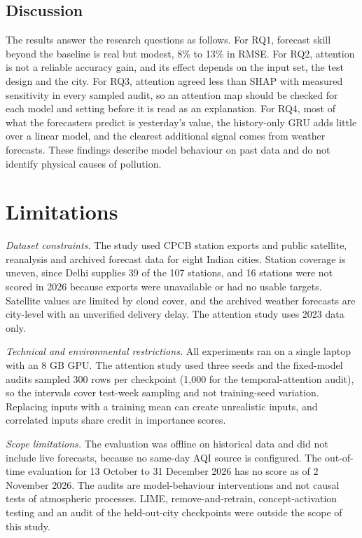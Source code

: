 \documentclass[pdflatex,sn-mathphys-num]{sn-jnl}
\begin{document}
\subsection{Discussion}
The results answer the research questions as follows. For RQ1, forecast skill beyond the baseline is real but modest, 8\% to 13\% in RMSE. For RQ2, attention is not a reliable accuracy gain, and its effect depends on the input set, the test design and the city. For RQ3, attention agreed less than SHAP with measured sensitivity in every sampled audit, so an attention map should be checked for each model and setting before it is read as an explanation. For RQ4, most of what the forecasters predict is yesterday's value, the history-only GRU adds little over a linear model, and the clearest additional signal comes from weather forecasts. These findings describe model behaviour on past data and do not identify physical causes of pollution.

\section{Limitations}\label{sec:limits}
\emph{Dataset constraints.} The study used CPCB station exports and public satellite, reanalysis and archived forecast data for eight Indian cities. Station coverage is uneven, since Delhi supplies 39 of the 107 stations, and 16 stations were not scored in 2026 because exports were unavailable or had no usable targets. Satellite values are limited by cloud cover, and the archived weather forecasts are city-level with an unverified delivery delay. The attention study uses 2023 data only.

\emph{Technical and environmental restrictions.} All experiments ran on a single laptop with an 8 GB GPU. The attention study used three seeds and the fixed-model audits sampled 300 rows per checkpoint (1,000 for the temporal-attention audit), so the intervals cover test-week sampling and not training-seed variation. Replacing inputs with a training mean can create unrealistic inputs, and correlated inputs share credit in importance scores.

\emph{Scope limitations.} The evaluation was offline on historical data and did not include live forecasts, because no same-day AQI source is configured. The out-of-time evaluation for 13 October to 31 December 2026 has no score as of 2 November 2026. The audits are model-behaviour interventions and not causal tests of atmospheric processes. LIME, remove-and-retrain, concept-activation testing and an audit of the held-out-city checkpoints were outside the scope of this study.
\end{document}
